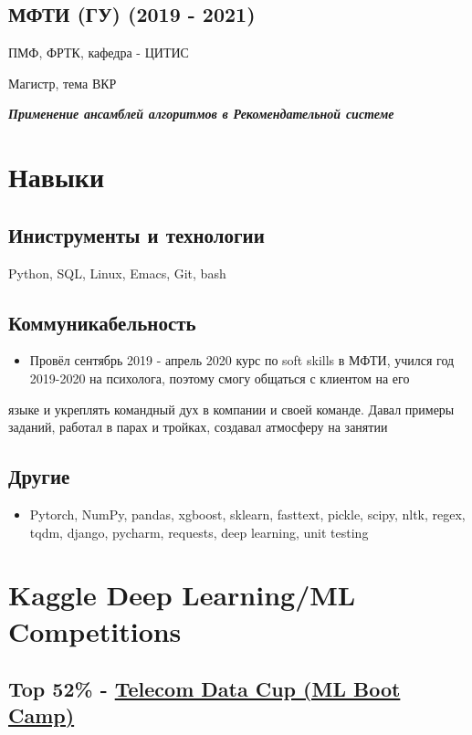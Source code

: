 \documentclass[11pt]{article}
\begin{document}
\subsection{МФТИ (ГУ) (2019 - 2021)}
\label{sec:org2c2c279}
ПМФ, ФРТК, кафедра - ЦИТИС

Магистр, тема ВКР
\begin{center}
\textbf{\emph{Применение ансамблей алгоритмов в Рекомендательной системе}}
\end{center}

\section{Навыки}
\label{sec:org4621ce4}
\subsection{Иниструменты и технологии}
\label{sec:org6889d08}
Python, SQL, Linux, Emacs, Git, bash
\subsection{Коммуникабельность}
\label{sec:orgd3333ca}
\begin{itemize}
\item Провёл сентябрь 2019 - апрель 2020 курс по soft skills в МФТИ, учился год 2019-2020 на психолога, поэтому смогу общаться с клиентом на его
\end{itemize}
языке и укреплять командный дух в компании и своей команде. Давал примеры заданий, работал в парах и тройках, создавал атмосферу на занятии
\subsection{Другие}
\label{sec:org4e5b090}
\begin{itemize}
\item Pytorch, NumPy, pandas, xgboost, sklearn, fasttext, pickle, scipy, nltk, regex, tqdm, django, pycharm, requests, deep learning, unit testing
\end{itemize}
\section{Kaggle Deep Learning/ML Competitions}
\label{sec:org45f7520}
\subsection{Top 52\% - \href{https://cups.mail.ru/results/41?period=past\&round\_id=430}{Telecom Data Cup (ML Boot Camp)}}
\label{sec:org204f455}
\end{document}

